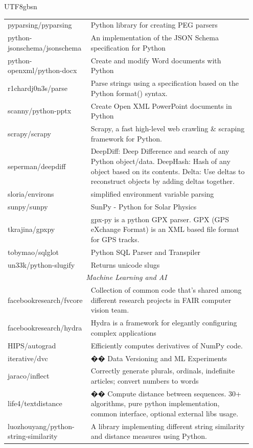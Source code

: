 \begin{CJK*}{UTF8}{gbsn}
\begin{longtable}{p{0.3\linewidth} | p{0.65\linewidth}}
pyparsing/pyparsing & Python library for creating PEG parsers \\
python-jsonschema/jsonschema & An implementation of the JSON Schema specification for Python \\
python-openxml/python-docx & Create and modify Word documents with Python \\
r1chardj0n3s/parse & Parse strings using a specification based on the Python format() syntax. \\
scanny/python-pptx & Create Open XML PowerPoint documents in Python \\
scrapy/scrapy & Scrapy, a fast high-level web crawling \& scraping framework for Python. \\
seperman/deepdiff & DeepDiff: Deep Difference and search of any Python object/data. DeepHash: Hash of any object based on its contents. Delta: Use deltas to reconstruct objects by adding deltas together. \\
sloria/environs & simplified environment variable parsing \\
sunpy/sunpy & SunPy - Python for Solar Physics \\
tkrajina/gpxpy & gpx-py is a python GPX parser. GPX (GPS eXchange Format) is an XML based file format for GPS tracks. \\
tobymao/sqlglot & Python SQL Parser and Transpiler \\
un33k/python-slugify & Returns unicode slugs \\
\midrule
\multicolumn{2}{c}{\textit{Machine Learning and AI}} \\
\midrule
facebookresearch/fvcore & Collection of common code that's shared among different research projects in FAIR computer vision team. \\
facebookresearch/hydra & Hydra is a framework for elegantly configuring complex applications \\
HIPS/autograd & Efficiently computes derivatives of NumPy code. \\
iterative/dvc & �� Data Versioning and ML Experiments \\
jaraco/inflect & Correctly generate plurals, ordinals, indefinite articles; convert numbers to words \\
life4/textdistance & �� Compute distance between sequences. 30+ algorithms, pure python implementation, common interface, optional external libs usage. \\
luozhouyang/python-string-similarity & A library implementing different string similarity and distance measures using Python. \\

\end{longtable}
\end{CJK*}
